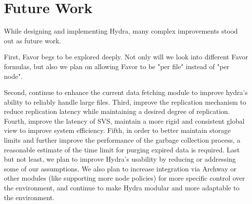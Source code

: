 \section{Future Work} \label{sec:future-work}
While designing and implementing Hydra, many complex improvements stood out as future work.

First, Favor begs to be explored deeply. Not only will we look into different Favor formulas, but also we plan on allowing Favor to be "per file" instead of "per node".

Second, continue to enhance the current data fetching module to improve hydra's ability to reliably handle large files. Third, improve the replication mechanism to reduce replication latency while maintaining a desired degree of replication. Fourth, improve the latency of SVS, maintain a more rigid and consistent global view to improve system efficiency. Fifth, in order to better maintain storage limits and further improve the performance of the garbage collection process, a reasonable estimate of the time limit for purging expired data is required. Last but not least, we plan to improve Hydra's usability by reducing or addressing some of our assumptions. We also plan to increase integration via Archway or other modules (like supporting more node policies) for more specific control over the environment, and continue to make Hydra modular and more adaptable to the environment.

